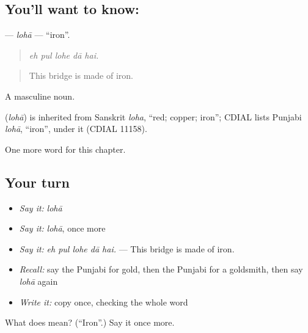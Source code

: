 \subsection*{You'll want to know: }
\textbf{} — \emph{lohā} — \textquotedblleft{}iron\textquotedblright{}.

\begin{quote}
    
\end{quote}

\begin{quote}
\emph{eh pul lohe dā hai.}
\end{quote}

\begin{quote}
This bridge is made of iron.
\end{quote}

A masculine noun.

\begin{cousinweb}
\textbf{} (\emph{lohā}) is inherited from Sanskrit \emph{loha}, \textquotedblleft{}red; copper; iron\textquotedblright{}; CDIAL lists Punjabi \emph{lohā}, \textquotedblleft{}iron\textquotedblright{}, under it (CDIAL 11158).
\end{cousinweb}

\begin{grammarlens}[title={What you've built}]
One more word for this chapter.
\end{grammarlens}

\subsection*{Your turn}
\begin{itemize}
\raggedright
  \item \emph{Say it:} \emph{lohā}
  \item \emph{Say it:} \emph{lohā}, once more
  \item \emph{Say it:} \emph{eh pul lohe dā hai.} — This bridge is made of iron.
  \item \emph{Recall:} say the Punjabi for gold, then the Punjabi for a goldsmith, then say \emph{lohā} again
  \item \emph{Write it:} copy \textbf{} once, checking the whole word
\end{itemize}

\begin{tcolorbox}[breakable,colback=teal!4,colframe=teal!35!black,title={Before you move on}]
What does  mean? (\textquotedblleft{}Iron\textquotedblright{}.) Say it once more.
\end{tcolorbox}
